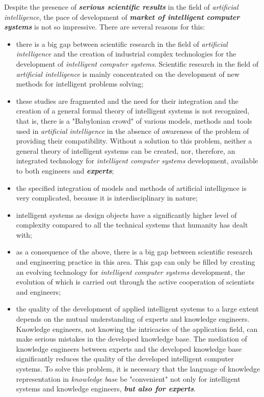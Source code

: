 \documentclass[10pt, a4paper]{proc}
\begin{document}
 \indent Despite the presence of \textbf{\textit{serious scientific results}} in the field of \textit{artificial intelligence}, the pace of development of \textbf{\textit{market of intelligent computer systems}} is not so impressive. There are several reasons for this:
 \begin{itemize}
  \item there is a big gap between scientific research in the field of \textit{artificial intelligence} and the creation of industrial complex technologies for the development of \textit{intelligent computer systems}. Scientific research in the field of \textit{artificial intelligence} is mainly concentrated on the development of new methods for intelligent problems solving;
  \item these studies are fragmented and the need for their integration and the creation of a general formal theory of intelligent systems is not recognized, that is, there is a "Babylonian crowd" of various models, methods and tools used in \textit{artificial intelligence} in the absence of awareness of the problem of providing their compatibility. Without a solution to this problem, neither a general theory of intelligent systems can be created, nor, therefore, an integrated technology for \textit{intelligent computer systems} development, available to both engineers and \textbf{\textit{experts}};
  \item the specified integration of models and methods of artificial intelligence is very complicated, because it is interdisciplinary in nature;
  \item intelligent systems as design objects have a significantly higher level of complexity compared to all the technical systems that humanity has dealt with;
  \item as a consequence of the above, there is a big gap between scientific research and engineering practice in this area. This gap can only be filled by creating an evolving technology for \textit{intelligent computer systems} development, the evolution of which is carried out through the active cooperation of scientists and engineers;
  \item the quality of the development of applied intelligent systems to a large extent depends on the mutual understanding of experts and knowledge engineers. Knowledge engineers, not knowing the intricacies of the application field, can make serious mistakes in the developed knowledge base. The mediation of knowledge engineers between experts and the developed knowledge base significantly reduces the quality of the developed intelligent computer systems. To solve this problem, it is necessary that the language of knowledge representation in \textit{knowledge base} be "convenient" not only for intelligent systems and knowledge engineers, \textit{\textbf{but also for experts}}.
 \end{itemize}
\end{document}
